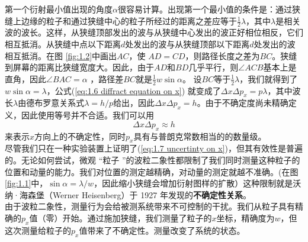 	\indent 第一个衍射最小值出现的角度$\alpha$很容易计算。出现第一个最小值的条件是：通过狭缝上边缘的粒子和通过狭缝中心的粒子所经过的距离之差应等于$\frac{1}{2}\lambda$，其中$\lambda$是相关波的波长。这样，从狭缝顶部发出的波与从狭缝中心发出的波正好相位相反，它们相互抵消。从狭缝中点以下距离$d$处发出的波与从狭缝顶部以下距离$d$处发出的波相互抵消。在图 \ref{fig:1.2}中画出$AC$，使 $AD=CD$，则路径长度之差为$BC$。狭缝到屏幕的距离比狭缝宽度大。因此，由于$AD$和$BD$几乎平行，则$\angle ACB$基本上是直角，因此$\angle BAC = \alpha$ ，路径差$BC$就是$\frac{1}{2}w \sin \alpha$。 设$BC$等于$\frac{1}{2}\lambda$，我们就得到了$w\sin\alpha=\lambda$，公式(\ref{eq:1.6 diffract equation on x}) 就变成了$\Delta x \Delta p_x=p\lambda$，其中波长$\lambda$由德布罗意关系式$\lambda=h/p$给出，因此$\Delta x \Delta p_x=h$。由于不确定度尚未精确定义，因此使用等号并不合适。我们可以用 
	\begin{equation}
		\Delta x \Delta p_x \approx h
		\label{eq:1.7 uncertinty on x}
	\end{equation}
	来表示$x$方向上的不确定性，同时$p_x$具有与普朗克常数相当的的数量级。\\
	\indent 尽管我们只在一种实验装置上证明了(\ref{eq:1.7 uncertinty on x})，但其有效性是普遍的。无论如何尝试，微观 “粒子 ”的波粒二象性都限制了我们同时测量这种粒子的位置和动量的能力。我们对位置的测定越精确，对动量的测定就越不准确。(在图\ref{fig:1.1}中，$\sin \alpha = \lambda / w$，因此缩小狭缝会增加衍射图样的扩散）这种限制就是沃纳·海森堡（Werner Heisenberg）于 1927 年发现的\textbf{不确定性关系}。\\
	\indent 由于波粒二象性，测量行为会给被测系统带来不可控制的干扰。我们从粒子具有精确的$p_x$值（零）开始。通过施加狭缝，我们测量了粒子的$x$坐标，精确度为$w$，但这次测量给粒子的$p_x$值带来了不确定性。测量改变了系统的状态。
	
	
